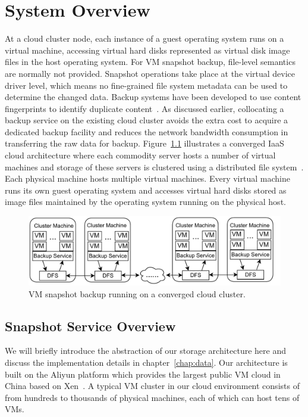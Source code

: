 \chapter{System Overview}
\label{chap:overview}
At a cloud cluster node, each instance of a guest operating system runs on a virtual machine, accessing virtual hard disks 
represented as virtual disk image files in the host operating system.
For VM snapshot backup, file-level semantics are normally not provided.
Snapshot operations take place at the virtual device driver level, which
means no fine-grained file system metadata can be used to determine the changed data. 
Backup systems have been developed to use content fingerprints to identify duplicate
content~\cite{venti02,Rhea2008}.  
As discussed earlier, collocating a backup service on the existing
cloud cluster avoids the extra cost to acquire a dedicated backup facility
and reduces the network bandwidth consumption in transferring the
raw data for backup. 
Figure~\ref{fig:collocated} illustrates a converged IaaS cloud architecture
where each commodity server hosts a number of virtual machines and storage of these servers
is clustered using a distributed file system~\cite{googlefs03,hdfs10}.
Each physical machine hosts multiple virtual machines.  Every virtual machine
runs its own guest operating system and accesses virtual hard disks
stored as image files maintained by the operating system running on the
physical host.

\begin{figure}[htb]
    \centering
    \includegraphics[width=5in]{images/colocated-arch}
    \caption{VM snapshot backup running on a converged cloud cluster.}
    \label{fig:collocated}
\end{figure}

\section{Snapshot Service Overview}
\label{overview:ss}
We will briefly introduce the abstraction of our storage architecture here 
and discuss the implementation details in chapter~\ref{chap:data}.
Our architecture is built on the Aliyun platform which provides the largest public VM cloud in China 
based on Xen~\cite{Xen2003}. A typical VM cluster in our cloud environment
consists of from hundreds to thousands of physical machines, each of which can
host tens of VMs.

